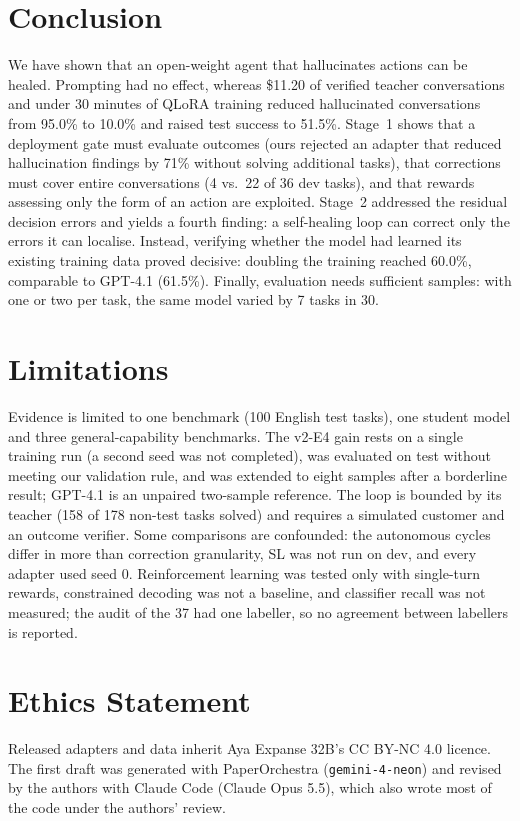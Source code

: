 \documentclass[11pt]{article}
\begin{document}
\section{Conclusion}
\label{sec:conclusion}
We have shown that an open-weight agent that hallucinates actions can be healed. Prompting had no effect, whereas \$11.20 of verified teacher conversations and under 30 minutes of QLoRA training reduced hallucinated conversations from 95.0\% to 10.0\% and raised test success to 51.5\%. Stage~1 shows that a deployment gate must evaluate outcomes (ours rejected an adapter that reduced hallucination findings by 71\% without solving additional tasks), that corrections must cover entire conversations (4 vs.\ 22 of 36 dev tasks), and that rewards assessing only the form of an action are exploited. Stage~2 addressed the residual decision errors and yields a fourth finding: a self-healing loop can correct only the errors it can localise. Instead, verifying whether the model had learned its existing training data proved decisive: doubling the training reached 60.0\%, comparable to GPT-4.1 (61.5\%). Finally, evaluation needs sufficient samples: with one or two per task, the same model varied by 7 tasks in 30.

\section*{Limitations}
Evidence is limited to one benchmark (100 English test tasks), one student model and three general-capability benchmarks. The v2-E4 gain rests on a single training run (a second seed was not completed), was evaluated on test without meeting our validation rule, and was extended to eight samples after a borderline result; GPT-4.1 is an unpaired two-sample reference. The loop is bounded by its teacher (158 of 178 non-test tasks solved) and requires a simulated customer and an outcome verifier. Some comparisons are confounded: the autonomous cycles differ in more than correction granularity, SL was not run on dev, and every adapter used seed 0. Reinforcement learning was tested only with single-turn rewards, constrained decoding was not a baseline, and classifier recall was not measured; the audit of the 37 had one labeller, so no agreement between labellers is reported.

\section*{Ethics Statement}
Released adapters and data inherit Aya Expanse 32B's CC BY-NC 4.0 licence. The first draft was generated with PaperOrchestra (\texttt{gemini-4-neon}) and revised by the authors with Claude Code (Claude Opus 5.5), which also wrote most of the code under the authors' review.
\end{document}
